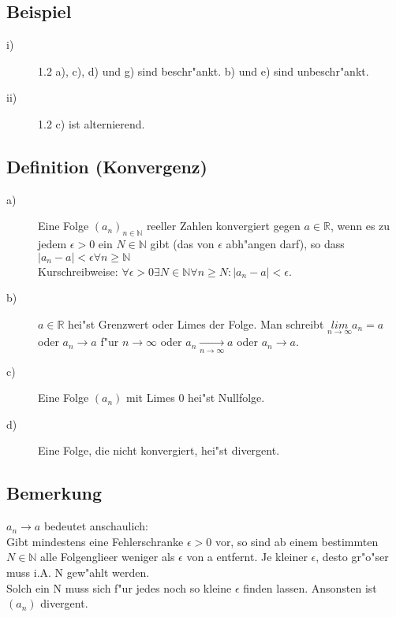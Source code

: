 \documentclass[12pt,a4paper]{article}
\begin{document}
\subsection{Beispiel}
\begin{description}
\item[i)]
1.2 a), c), d) und g) sind beschr"ankt. b) und e) sind unbeschr"ankt.
\item[ii)]
1.2 c) ist alternierend.
\end{description}
\subsection{Definition (Konvergenz)}
\begin{description}
\item[a)]
Eine Folge $(a_n)_{n \in \mathbb{N}}$ reeller Zahlen konvergiert gegen $a \in \mathbb{R}$, wenn es zu jedem $\epsilon > 0$ ein $N \in \mathbb{N}$ gibt (das von $\epsilon$ abh"angen darf), so dass \\
$ |a_n - a | < \epsilon \forall n \geq \mathbb{N}$
\\
Kurschreibweise: $ \forall \epsilon > 0 \exists N \in \mathbb{N} \forall n \geq N: |a_n -a| < \epsilon$.
\item[b)]
$a \in \mathbb{R}$ hei"st Grenzwert oder Limes der Folge. Man schreibt $\underset{n \rightarrow \infty}{lim} a_n = a$ oder $a_n \rightarrow a$ f"ur $n \rightarrow \infty$ oder $a_n \underset{n \rightarrow\infty}{\rightarrow} a$ oder $a_n \rightarrow a$.
\item[c)]
Eine Folge $(a_n)$ mit Limes 0 hei"st Nullfolge.
\item[d)]
Eine Folge, die nicht konvergiert, hei"st divergent.
\end{description}
\subsection{Bemerkung}
$a_n \rightarrow a$ bedeutet anschaulich: \\
Gibt mindestens eine Fehlerschranke $\epsilon > 0$ vor, so sind ab einem bestimmten $N \in \mathbb{N}$ alle Folgenglieer weniger als $\epsilon$ von a entfernt. Je kleiner $\epsilon$, desto gr"o"ser muss i.A. N gew"ahlt werden. \\
Solch ein N muss sich f"ur jedes noch so kleine $\epsilon$ finden lassen. Ansonsten ist $(a_n)$ divergent.
\end{document}
